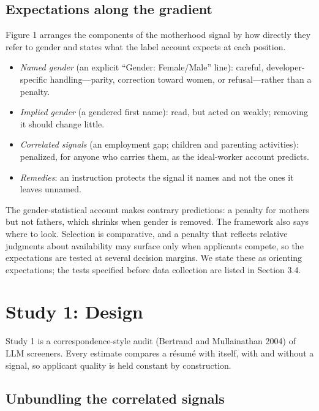 \documentclass[11pt]{article}
\providecommand{\tightlist}{\setlength{\itemsep}{2pt}\setlength{\parskip}{0pt}}
\begin{document}
\hypertarget{expectations-along-the-gradient}{%
\subsection{Expectations along the
gradient}\label{expectations-along-the-gradient}}

Figure 1 arranges the components of the motherhood signal by how
directly they refer to gender and states what the label account expects
at each position.

\begin{itemize}
\tightlist
\item
  \emph{Named gender} (an explicit ``Gender: Female/Male'' line):
  careful, developer-specific handling---parity, correction toward
  women, or refusal---rather than a penalty.
\item
  \emph{Implied gender} (a gendered first name): read, but acted on
  weakly; removing it should change little.
\item
  \emph{Correlated signals} (an employment gap; children and parenting
  activities): penalized, for anyone who carries them, as the
  ideal-worker account predicts.
\item
  \emph{Remedies}: an instruction protects the signal it names and not
  the ones it leaves unnamed.
\end{itemize}

The gender-statistical account makes contrary predictions: a penalty for
mothers but not fathers, which shrinks when gender is removed. The
framework also says where to look. Selection is comparative, and a
penalty that reflects relative judgments about availability may surface
only when applicants compete, so the expectations are tested at several
decision margins. We state these as orienting expectations; the tests
specified before data collection are listed in Section 3.4.

\hypertarget{study-1-design}{%
\section{Study 1: Design}\label{study-1-design}}

Study 1 is a correspondence-style audit (Bertrand and Mullainathan 2004)
of LLM screeners. Every estimate compares a résumé with itself, with and
without a signal, so applicant quality is held constant by construction.

\hypertarget{unbundling-the-correlated-signals}{%
\subsection{Unbundling the correlated
signals}\label{unbundling-the-correlated-signals}}
\end{document}
